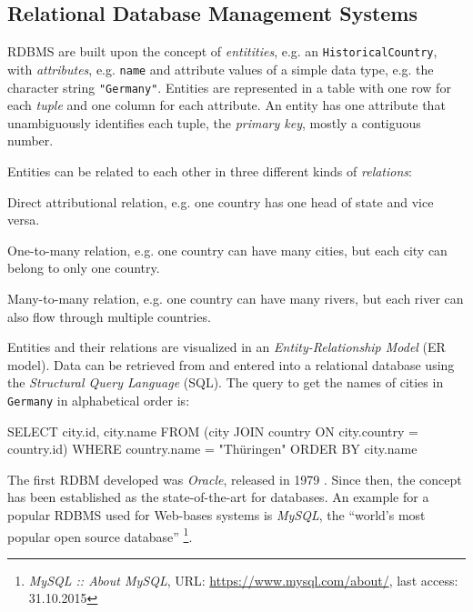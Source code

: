 \subsection{Relational Database Management Systems} %
\label{sub:relational_database_management_systems}

RDBMS are built upon the concept of \emph{entitities}, e.g. an \texttt{HistoricalCountry}, with \emph{attributes}, e.g. \texttt{name} and attribute values of a simple data type, e.g. the character string \texttt{"Germany"}. Entities are represented in a table with one row for each \emph{tuple} and one column for each attribute. An entity has one attribute that unambiguously identifies each tuple, the \emph{primary key}, mostly a contiguous number.

Entities can be related to each other in three different kinds of \emph{relations}:
\begin{compactenum}
  \item[\texttt{1:1}] Direct attributional relation, e.g. one country has one head of state and vice versa.
  \item[\texttt{1:n}] One-to-many relation, e.g. one country can have many cities, but each city can belong to only one country.
  \item[\texttt{m:n}] Many-to-many relation, e.g. one country can have many rivers, but each river can also flow through multiple countries.
\end{compactenum}

Entities and their relations are visualized in an \emph{Entity-Relationship Model} (ER model). Data can be retrieved from and entered into a relational database using the \emph{Structural Query Language} (SQL). The query to get the names of cities in \texttt{Germany} in alphabetical order is:

\vspace{-1em}
\begin{verbatimtab}
  SELECT     city.id, city.name
  FROM       (city JOIN country ON city.country = country.id)
  WHERE      country.name = "Thüringen"
  ORDER BY   city.name
\end{verbatimtab}
\vspace{-1em}

The first RDBM developed was \emph{Oracle}, released in 1979 \cite{oracleDB}. Since then, the concept has been established as the state-of-the-art for databases. An example for a popular RDBMS used for Web-bases systems is \emph{MySQL}, the ``world's most popular open source database''
\footnote{
  \emph{MySQL :: About MySQL},
  URL: \url{https://www.mysql.com/about/},
  last access: 31.10.2015
}.


